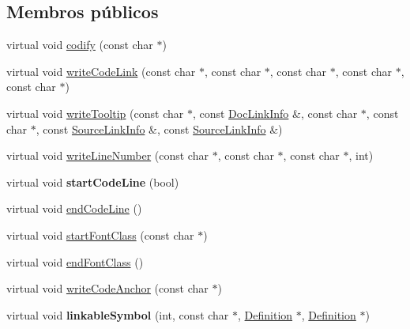 \subsection*{Membros públicos}
\begin{DoxyCompactItemize}
\item 
virtual void \hyperlink{class_dev_null_code_doc_interface_ae795c13518eb3523e41920859b64bae3}{codify} (const char $\ast$)
\item 
virtual void \hyperlink{class_dev_null_code_doc_interface_a2ced6ffd253f23812cd3db949a305e9e}{write\-Code\-Link} (const char $\ast$, const char $\ast$, const char $\ast$, const char $\ast$, const char $\ast$)
\item 
virtual void \hyperlink{class_dev_null_code_doc_interface_a1009688e232ec64f703d534ece6bd8c6}{write\-Tooltip} (const char $\ast$, const \hyperlink{struct_doc_link_info}{Doc\-Link\-Info} \&, const char $\ast$, const char $\ast$, const \hyperlink{struct_source_link_info}{Source\-Link\-Info} \&, const \hyperlink{struct_source_link_info}{Source\-Link\-Info} \&)
\item 
virtual void \hyperlink{class_dev_null_code_doc_interface_ab884475bfa9aae3d714d0583402dc7a6}{write\-Line\-Number} (const char $\ast$, const char $\ast$, const char $\ast$, int)
\item 
\hypertarget{class_dev_null_code_doc_interface_af3e5b954e395f5273acb62f73cda0a8d}{virtual void {\bfseries start\-Code\-Line} (bool)}\label{class_dev_null_code_doc_interface_af3e5b954e395f5273acb62f73cda0a8d}

\item 
virtual void \hyperlink{class_dev_null_code_doc_interface_a9eac5f8973e5f7c2a4500d3daa5c125f}{end\-Code\-Line} ()
\item 
virtual void \hyperlink{class_dev_null_code_doc_interface_a3595d576933897558124c28746b819f9}{start\-Font\-Class} (const char $\ast$)
\item 
virtual void \hyperlink{class_dev_null_code_doc_interface_adc05c3c53aeaba27ae7d22334168c413}{end\-Font\-Class} ()
\item 
virtual void \hyperlink{class_dev_null_code_doc_interface_a0bdf0a5b7ff33f368aa90d95063530ee}{write\-Code\-Anchor} (const char $\ast$)
\item 
\hypertarget{class_dev_null_code_doc_interface_a78007617a719be9aba2ccc98916ffdf6}{virtual void {\bfseries linkable\-Symbol} (int, const char $\ast$, \hyperlink{class_definition}{Definition} $\ast$, \hyperlink{class_definition}{Definition} $\ast$)}\label{class_dev_null_code_doc_interface_a78007617a719be9aba2ccc98916ffdf6}


\end{DoxyCompactItemize}
